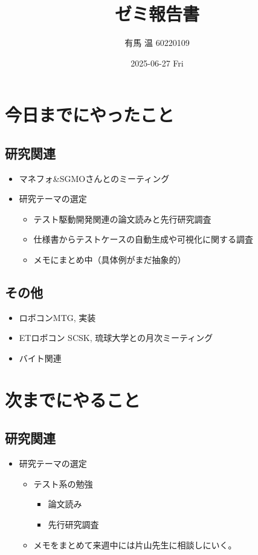 \documentclass[uplatex, onecolumn, 10pt]{jsarticle}
\begin{document}
\title{\vspace{-40mm}\bf{\LARGE{ゼミ報告書}}}
\author{\vspace{-40mm}有馬 温  60220109}
\date{2025-06-27 Fri}
\maketitle


\section{今日までにやったこと}

\subsection*{研究関連}
\begin{itemize}
    \item マネフォ\&SGMOさんとのミーティング
    \item 研究テーマの選定
    \begin{itemize}
        \item テスト駆動開発関連の論文読みと先行研究調査
        \item 仕様書からテストケースの自動生成や可視化に関する調査
        \item メモにまとめ中（具体例がまだ抽象的）
    \end{itemize}

\end{itemize}

\subsection*{その他}
\begin{itemize}
	\item ロボコンMTG, 実装
    \item ETロボコン SCSK, 琉球大学との月次ミーティング
    \item バイト関連
\end{itemize}



\section{次までにやること}

\subsection*{研究関連}
\begin{itemize}
    \item 研究テーマの選定
    \begin{itemize}
        \item テスト系の勉強
        \begin{itemize}
            \item 論文読み
            \item 先行研究調査
        \end{itemize}
        \item メモをまとめて来週中には片山先生に相談しにいく。
    \end{itemize}
\end{itemize}
\end{document}
